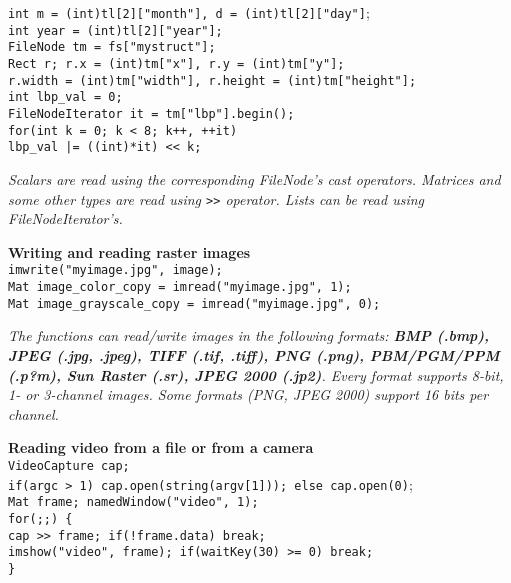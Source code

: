 \documentclass[10pt,landscape]{article}
\begin{document}
\begin{multicols}{3}
\begin{tabbing}
\texttt{int m = (int)tl[2]["month"], d = (int)tl[2]["day"]};\\
\texttt{int year = (int)tl[2]["year"];}\\

\texttt{FileNode tm = fs["mystruct"];}\\

\texttt{Rect r; r.x = (int)tm["x"], r.y = (int)tm["y"];}\\
\texttt{r.width = (int)tm["width"], r.height = (int)tm["height"];}\\
 
\texttt{int lbp\_val = 0;}\\
\texttt{FileNodeIterator it = tm["lbp"].begin();}\\

\texttt{for(int k = 0; k < 8; k++, ++it)}\\
\>\texttt{lbp\_val |= ((int)*it) << k;}\\
\end{tabbing}

\emph{Scalars are read using the corresponding FileNode's cast operators. Matrices and some other types are read using \texttt{>>} operator. Lists can be read using FileNodeIterator's.}

\begin{tabbing}
\textbf{Wr}\=\textbf{iting and reading raster images}\\
\texttt{imwrite("myimage.jpg", image);}\\
\texttt{Mat image\_color\_copy = imread("myimage.jpg", 1);}\\
\texttt{Mat image\_grayscale\_copy = imread("myimage.jpg", 0);}\\
\end{tabbing}

\emph{The functions can read/write images in the following formats: \textbf{BMP (.bmp), JPEG (.jpg, .jpeg), TIFF (.tif, .tiff), PNG (.png), PBM/PGM/PPM (.p?m), Sun Raster (.sr), JPEG 2000 (.jp2)}. Every format supports 8-bit, 1- or 3-channel images. Some formats (PNG, JPEG 2000) support 16 bits per channel.}

\begin{tabbing}
\textbf{Re}\=\textbf{ading video from a file or from a camera}\\
\texttt{VideoCapture cap;}\\
\texttt{if(argc > 1) cap.open(string(argv[1])); else cap.open(0)};\\
\texttt{Mat frame; namedWindow("video", 1);}\\
\texttt{for(;;) \{}\\
\>\texttt{cap >> frame; if(!frame.data) break;}\\
\>\texttt{imshow("video", frame); if(waitKey(30) >= 0) break;}\\
\texttt{\} }
\end{tabbing}


\end{multicols}
\end{document}
